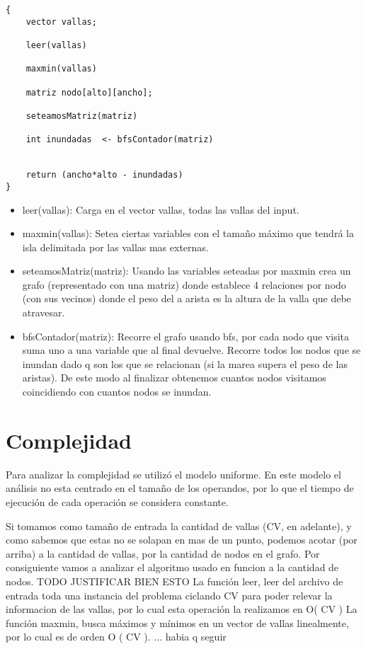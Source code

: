 \documentclass[a4paper, 12pt]{article}
\begin{document}
\begin{verbatim}
{
	vector vallas;

	leer(vallas)

	maxmin(vallas)

	matriz nodo[alto][ancho];

	seteamosMatriz(matriz)

	int inundadas  <- bfsContador(matriz)


	return (ancho*alto - inundadas)
}
\end{verbatim}
\begin{itemize}

\item leer(vallas): Carga en el vector vallas, todas las vallas del input.

\item maxmin(vallas): Setea ciertas variables con el tama\~no m\'aximo que tendrá la isla delimitada por las vallas mas externas.

\item seteamosMatriz(matriz): Usando las variables seteadas por maxmin crea un grafo (representado con una matriz) donde establece 4 relaciones por nodo (con sus vecinos) donde el peso del a arista es la altura de la valla que debe atravesar.

\item bfsContador(matriz): Recorre el grafo usando bfs, por cada nodo que visita suma uno a una variable que al final devuelve. Recorre todos los nodos que se inundan dado q son los que se relacionan (si la marea supera el peso de las aristas). De este modo al finalizar obtenemos cuantos nodos visitamos coincidiendo con cuantos nodos se inundan.

\end{itemize}


\section*{Complejidad}
Para analizar la complejidad se utiliz\'o el modelo uniforme. En este modelo el an\'alisis no esta centrado en el tama\~{n}o de los operandos, por lo que el tiempo de ejecuci\'on de cada operaci\'on se considera constante.

Si tomamos como tama\~no de entrada la cantidad de vallas (CV, en adelante), y como sabemos que estas no se solapan en mas de un punto, podemos acotar (por arriba) a la cantidad de vallas, por la cantidad de nodos en el grafo. Por consiguiente vamos a analizar el algoritmo usado en funcion a la cantidad de nodos. TODO JUSTIFICAR BIEN ESTO
La funci\'on leer, leer del archivo de entrada toda una instancia del problema ciclando CV para poder relevar la informacion de las vallas, por lo cual esta operaci\'on la realizamos en O( CV ) 
La funci\'on maxmin, busca m\'aximos y m\'inimos en un vector de vallas linealmente, por lo cual es de orden O ( CV ).
...
habia q seguir
\end{document}
